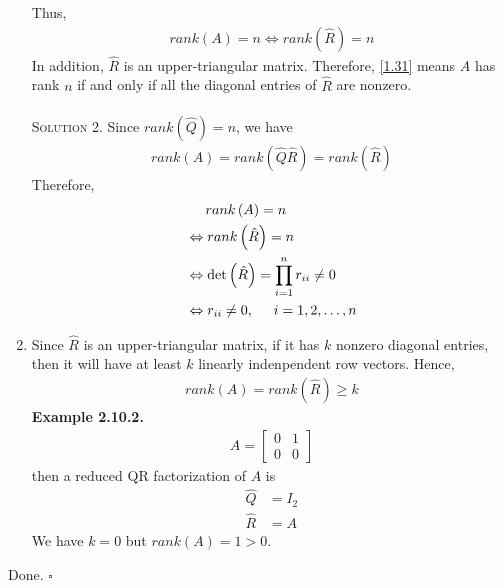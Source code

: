 \documentclass[a4paper,oneside]{book}
\numberwithin{equation}{chapter}
\begin{document}
\begin{enumerate}
Thus, 
\begin{align}
\label{1.31}
rank\left( A \right) = n \Leftrightarrow rank\left( {\hat R} \right) = n
\end{align}
In addition, $\hat R$ is an upper-triangular matrix. Therefore, \eqref{1.31} means $A$ has rank $n$ if and only if all the diagonal entries of $\hat R$ are nonzero.\\
\\
\textsc{Solution 2.} Since $rank\left( \hat Q\right) =n$, we have
\begin{align}
rank\left( A \right) = rank\left( {\hat Q\hat R} \right) = rank\left( {\hat R} \right)
\end{align}
Therefore, 
\begin{align}
&\hspace{0.5cm} rank\left( A \right) = n\\
& \Leftrightarrow rank\left( {\hat R} \right) = n\\
& \Leftrightarrow \det \left( {\hat R} \right)= \prod\limits_{i = 1}^n {{r_{ii}}}  \ne 0\\
& \Leftrightarrow {r_{ii}} \ne 0,\hspace{0.5cm} i = 1,2, \ldots ,n
\end{align}
\item Since $\hat R$ is an upper-triangular matrix, if it has $k$ nonzero diagonal entries, then it will have at least $k$ linearly indenpendent row vectors. Hence,
\begin{align}
rank\left( A \right) = rank\left( {\hat R} \right) \ge k
\end{align}
\textbf{Example 2.10.2.} 
\begin{align}
A = \left[ {\begin{array}{*{20}{c}}
0&1\\
0&0
\end{array}} \right]
\end{align}
then a reduced QR factorization of $A$ is
\begin{align}
\hat Q &= {I_2}\\
\hat R &= A
\end{align}
We have $k=0$ but $rank\left(A\right)=1>0$.
\end{enumerate}
Done. \hfill $\square$\\
\end{document}
